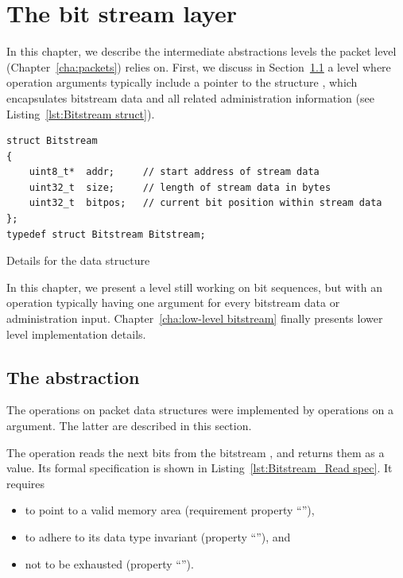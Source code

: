 
\FloatBarrier

\chapter{The bit stream layer}
\label{cha:bitstream}

In this chapter, we describe the intermediate abstractions levels the
packet level (Chapter~\ref{cha:packets}) relies on.
%
First, we discuss in Section~\ref{sec:bitstream}
a level where operation arguments typically include a pointer to the
\isoc structure , which
encapsulates bitstream data and all related administration information 
(see Listing~\ref{lst:Bitstream struct}).


\begin{listing}[hbt]
\begin{minipage}{0.99\textwidth}
\begin{lstlisting}[style=acsl-block]
struct Bitstream
{
    uint8_t*  addr;     // start address of stream data
    uint32_t  size;     // length of stream data in bytes
    uint32_t  bitpos;   // current bit position within stream data
};
typedef struct Bitstream Bitstream;
\end{lstlisting}
\end{minipage}
\caption{\label{lst:Bitstream struct}
	Details for the  data structure}
\end{listing}

\FloatBarrier

In this chapter, we present a level still working on
bit sequences, but with an operation typically
having one argument for every bitstream data or administration input.
%
Chapter~\ref{cha:low-level bitstream} finally presents lower level 
implementation details.


\section{The  abstraction}
\label{sec:bitstream}

The operations on packet data structures were implemented by 
operations on a  argument.
%
The latter are described in this section.

The operation 
reads the next  bits from the bitstream
, and returns them as a  value.
%
Its formal \acsl specification is shown in 
Listing~\ref{lst:Bitstream_Read spec}.
%
It requires 
%
\begin{itemize}
\item to point to a valid memory area 
	(requirement property ``''),
\item to adhere to its data type invariant
	(property ``''), and
\item not to be exhausted (property ``'').
\end{itemize}


